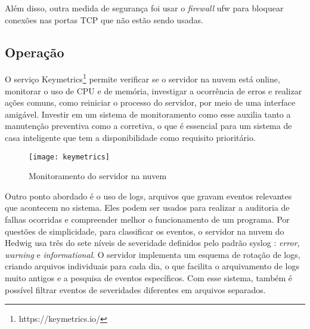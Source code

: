 Além disso, outra medida de segurança foi usar o \emph{firewall} ufw para bloquear conexões nas portas TCP que não estão sendo usadas.

\subsection{Operação}

O serviço Keymetrics\footnote{https://keymetrics.io/} permite verificar se o servidor na nuvem está online, monitorar o uso de CPU e de memória, investigar a ocorrência de erros e realizar ações comuns, como reiniciar o processo do servidor, por meio de uma interface amigável. Investir em um sistema de monitoramento como esse auxilia tanto a manutenção preventiva como a corretiva, o que é essencial para um sistema de casa inteligente que tem a disponibilidade como requisito prioritário.

\begin{figure}[H]
	\centering
	\caption{Monitoramento do servidor na nuvem}
  \texttt{[image: keymetrics]}
\label{fig:keymetrics}
\end{figure}

Outro ponto abordado é o uso de logs, arquivos que gravam eventos relevantes que acontecem no sistema. Eles podem ser usados para realizar a auditoria de falhas ocorridas e compreender melhor o funcionamento de um programa. Por questões de simplicidade, para classificar os eventos, o servidor na nuvem do Hedwig usa três do sete níveis de severidade definidos pelo padrão syslog \cite{rfc5424}: \emph{error}, \emph{warning} e \emph{informational}. O servidor implementa um esquema de rotação de logs, criando arquivos individuais para cada dia, o que facilita o arquivamento de logs muito antigos e a pesquisa de eventos específicos. Com esse sistema, também é possível filtrar eventos de severidades diferentes em arquivos separados.
